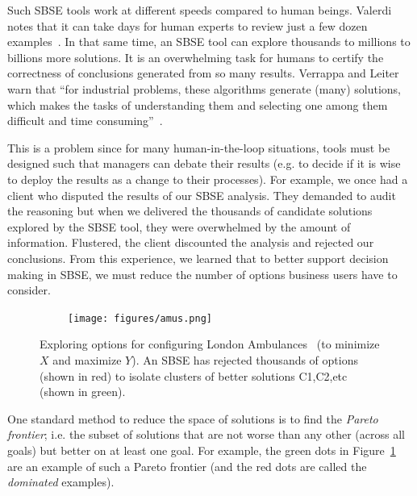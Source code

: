 \documentclass[10pt,journal,compsoc]{IEEEtran}
\newcommand{\fig}[1]{Figure~\ref{fig:#1}}
\begin{document}
Such SBSE tools work at different speeds compared to human
beings.  Valerdi notes that it can take days for
human experts to review just a few dozen
examples~\cite{valerdi11}.  In that same time, an
SBSE tool can explore thousands to millions to
billions more solutions.  It is an overwhelming task for humans to
certify the correctness of conclusions generated
from so many results. Verrappa and Leiter warn that
``for industrial problems, these algorithms generate
(many) solutions, which makes the tasks of
understanding them and selecting one among them
difficult and time consuming''~\cite{veer11}.

This is a problem since for many human-in-the-loop situations,
tools must be designed such that managers can debate their results
(e.g. to decide if it is wise
to deploy the results as a change to their
processes). 
For example, we once had a 
client who disputed the results of our SBSE analysis.
They
demanded to  audit the reasoning but
 when we delivered the thousands
of candidate solutions explored by the SBSE tool, they were overwhelmed by
the amount of information.  Flustered,
the client discounted the  analysis
and rejected our conclusions. From this experience, we learned that
to better support decision making in SBSE, we must reduce the number of options business users
have to consider.

\begin{figure}[!b]
~~~~~\texttt{[image: figures/amus.png]}
\caption{Exploring options for configuring London
Ambulances~\cite{veer11} (to minimize $X$ and maximize $Y$).
 An SBSE
has rejected thousands of options (shown in red) 
to isolate clusters of better solutions C1,C2,etc (shown in green). }\label{fig:one}
\end{figure}

One standard method to reduce the space of solutions is to find the {\em Pareto frontier}; i.e.
the subset of solutions 
that are not worse than any other (across all goals)
but better on at least one goal. 
For example,
the green dots
in \fig{one} are an example of such a Pareto
frontier (and the red dots are called the {\em dominated} examples).
\end{document}
